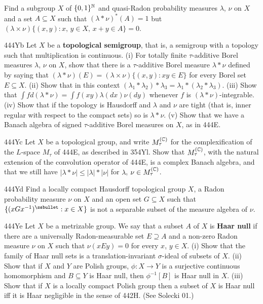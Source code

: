 {
Find a subgroup $X$ of $\{0,1\}^{\Bbb N}$ and
quasi-Radon probability measures $\lambda$, $\nu$ on $X$ and a set
$A\subseteq X$ such that $(\lambda*\nu)^*(A)=1$ but
$(\lambda\times\nu)\{(x,y):x,\,y\in X,\,x+y\in A\}=0$.

\spheader 444Yb Let $X$ be a {\bf topological semigroup}, that is, a
semigroup with a topology such that multiplication is continuous.
(i) For totally finite
$\tau$-additive Borel measures $\lambda$, $\nu$ on $X$, show that there
is a $\tau$-additive Borel measure $\lambda*\nu$ defined by saying that
$(\lambda*\nu)(E)=(\lambda\times\nu)\{(x,y):xy\in E\}$ for every Borel
set $E\subseteq X$.   (ii) Show that in this context
$(\lambda_1*\lambda_2)*\lambda_3=\lambda_1*(\lambda_2*\lambda_3)$.
(iii) Show that $\int fd(\lambda*\nu)=\int f(xy)\lambda(dx)\nu(dy)$
whenever $f$ is $(\lambda*\nu)$-integrable.   (iv) Show that if the
topology is Hausdorff and $\lambda$ and $\nu$ are tight (that is, inner
regular with respect to the compact sets) so is $\lambda*\nu$.   (v)
Show that we have
a Banach algebra of signed $\tau$-additive Borel measures on $X$, as in
444E.

\spheader 444Yc Let $X$ be a topological group, and write
$M_{\tau}^{(\Bbb C)}$ for the complexification of the $L$-space
$M_{\tau}$ of 444E, as described in 354Yl.   Show that
$M_{\tau}^{(\Bbb C)}$, with the natural extension of the convolution
operator of 444E, is a complex Banach algebra, and that we still have
$|\lambda*\nu|\le|\lambda|*|\nu|$ for $\lambda$,
$\nu\in M_{\tau}^{(\Bbb C)}$.

\spheader 444Yd Find a locally compact Hausdorff topological group $X$,
a Radon probability measure $\nu$ on $X$ and an open set $G\subseteq X$
such that $\{(xGx^{-1})^{\ssbullet}:x\in X\}$ is not a separable subset
of the measure algebra of $\nu$.

\spheader 444Ye Let $X$ be a metrizable group.
We say that a subset $A$ of $X$ is {\bf Haar null}
if there are a universally Radon-measurable set $E\supseteq A$ and a
non-zero Radon measure
$\nu$ on $X$ such that $\nu(xEy)=0$ for every $x$, $y\in X$.   (i) Show
that the family of Haar null sets is a translation-invariant
$\sigma$-ideal of subsets of $X$.
   (ii) Show that if $X$ and $Y$
are Polish groups, $\phi:X\to Y$ is a surjective continuous
homomorphism and
$B\subseteq Y$ is Haar null, then $\phi^{-1}[B]$ is Haar null in $X$.
(iii) Show that if $X$ is a
locally compact Polish group then a subset of $X$ is Haar null iff it is
Haar negligible in the sense of 442H.   (See {\smc Solecki 01}.)

}
